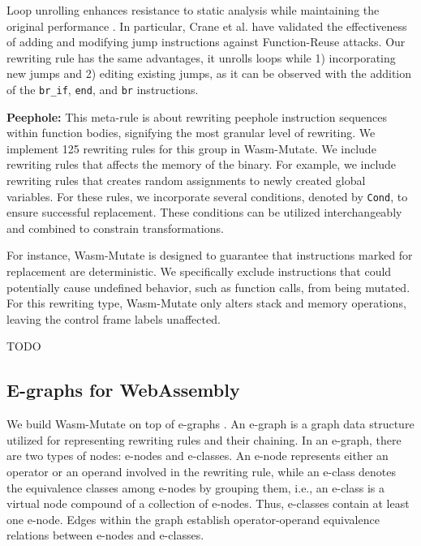 \documentclass[a4paper,fleqn]{cas-dc}
\newcommand*\badge[1]{ \colorbox{red}{\color{white}#1}}
\newcommand{\tool}{{\sc Wasm-Mutate}\xspace}
\newenvironment{revision1}{\color{blue}}{}
\newcommand{\todo}[1]{%
\refstepcounter{todo}
\noindent\textbf{\badge{TODO}} {\color{red}#1}
\addcontentsline{td}{todo}
{\color{red}\thesection.\thetodo\xspace #1}}
\begin{document}
Loop unrolling enhances resistance to static analysis while maintaining the original performance \cite{10.1145/3453483.3454035}. 
In particular, Crane et al. \cite{10.1145/2810103.2813682} have validated the effectiveness of adding and modifying jump instructions against Function-Reuse attacks.
Our rewriting rule has the same advantages, it unrolls loops while 1) incorporating new jumps and 2) editing existing jumps, as it can be observed with the addition of the \texttt{br_if}, \texttt{end}, and \texttt{br} instructions. 



\textbf{Peephole:} 
This meta-rule is about rewriting peephole instruction sequences within function bodies, signifying the most granular level of rewriting. 
We implement 125 rewriting rules for this group in \tool. 
We include rewriting rules that affects the memory of the binary.
For example, we include rewriting rules that creates random assignments to newly created global variables.
For these rules, we incorporate several conditions, denoted by \texttt{Cond}, to ensure successful replacement. 
These conditions can be utilized interchangeably and combined to constrain transformations.

For instance, \tool is designed to guarantee that instructions marked for replacement are deterministic. 
We specifically exclude instructions that could potentially cause undefined behavior, such as function calls, from being mutated. 
For this rewriting type, \tool only alters stack and memory operations, leaving the control frame labels unaffected.



\begin{revision1}
    TODO       
\end{revision1}

\subsection{E-graphs for WebAssembly}
\label{alg}

We build \tool on top of e-graphs \cite{10.1145/3571207}.
An e-graph is a graph data structure utilized for representing rewriting rules and their chaining. 
In an e-graph, there are two types of nodes: e-nodes and e-classes. 
An e-node represents either an operator or an operand involved in the rewriting rule, while an e-class denotes the equivalence classes among e-nodes by grouping them, i.e., an e-class is a virtual node compound of a collection of e-nodes. 
Thus, e-classes contain at least one e-node.
Edges within the graph establish operator-operand equivalence relations between e-nodes and e-classes.
\end{document}
